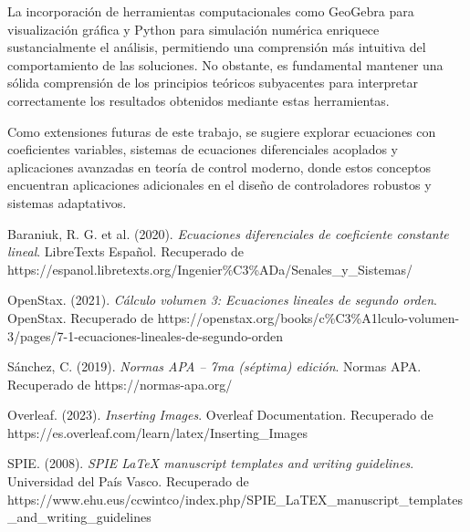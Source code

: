 \documentclass[12pt,a4paper]{article}
\begin{document}
La incorporación de herramientas computacionales como GeoGebra para visualización gráfica y Python para simulación numérica enriquece sustancialmente el análisis, permitiendo una comprensión más intuitiva del comportamiento de las soluciones. No obstante, es fundamental mantener una sólida comprensión de los principios teóricos subyacentes para interpretar correctamente los resultados obtenidos mediante estas herramientas.

Como extensiones futuras de este trabajo, se sugiere explorar ecuaciones con coeficientes variables, sistemas de ecuaciones diferenciales acoplados y aplicaciones avanzadas en teoría de control moderno, donde estos conceptos encuentran aplicaciones adicionales en el diseño de controladores robustos y sistemas adaptativos.




\begin{thebibliography}{10}

Baraniuk, R. G. et al. (2020). \textit{Ecuaciones diferenciales de coeficiente constante lineal}. LibreTexts Español. Recuperado de https://espanol.libretexts.org/Ingenier\%C3\%ADa/Senales\_y\_Sistemas/

OpenStax. (2021). \textit{Cálculo volumen 3: Ecuaciones lineales de segundo orden}. OpenStax. Recuperado de https://openstax.org/books/c\%C3\%A1lculo-volumen-3/pages/7-1-ecuaciones-lineales-de-segundo-orden

Sánchez, C. (2019). \textit{Normas APA – 7ma (séptima) edición}. Normas APA. Recuperado de https://normas-apa.org/

Overleaf. (2023). \textit{Inserting Images}. Overleaf Documentation. Recuperado de https://es.overleaf.com/learn/latex/Inserting\_Images

SPIE. (2008). \textit{SPIE LaTeX manuscript templates and writing guidelines}. Universidad del País Vasco. Recuperado de https://www.ehu.eus/ccwintco/index.php/SPIE\_LaTEX\_manuscript\_templates\_and\_writing\_guidelines

\end{thebibliography}
\end{document}
